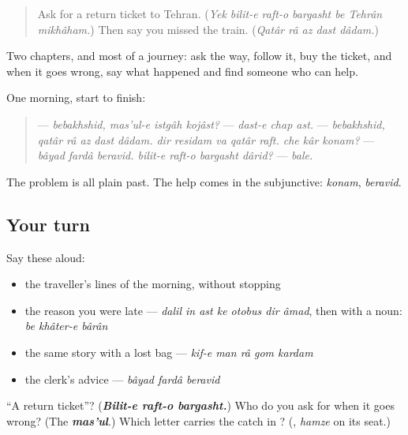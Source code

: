 \label{lesson:FA-R295-at-the-station}



\begin{quote}
Ask for a return ticket to Tehran. (\emph{Yek bilit-e raft-o bargasht be Tehrân mikhâham.}) Then say you missed the train. (\emph{Qatâr râ az dast dâdam.})
\end{quote}

\begin{grammarlens}[title={What you've built}]
Two chapters, and most of a journey: ask the way, follow it, buy the ticket, and when it goes wrong, say what happened and find someone who can help.

One morning, start to finish:

\begin{quote}
— \emph{bebakhshid, mas'ul-e istgâh kojâst?} — \emph{dast-e chap ast.} — \emph{bebakhshid, qatâr râ az dast dâdam. dir residam va qatâr raft. che kâr konam?} — \emph{bâyad fardâ beravid. bilit-e raft-o bargasht dârid?} — \emph{bale.}
\end{quote}

The problem is all plain past. The help comes in the subjunctive: \emph{konam}, \emph{beravid}.
\end{grammarlens}

\subsection*{Your turn}
Say these aloud:

\begin{itemize}
\raggedright
  \item the traveller's lines of the morning, without stopping
  \item the reason you were late — \emph{dalil in ast ke otobus dir âmad}, then with a noun: \emph{be khâter-e bârân}
  \item the same story with a lost bag — \emph{kif-e man râ gom kardam}
  \item the clerk's advice — \emph{bâyad fardâ beravid}
\end{itemize}

\begin{tcolorbox}[breakable,colback=teal!4,colframe=teal!35!black,title={Before you move on}]
\textquotedblleft{}A return ticket\textquotedblright{}? (\emph{\textbf{Bilit-e raft-o bargasht.}}) Who do you ask for when it goes wrong? (The \emph{\textbf{mas'ul}}.) Which letter carries the catch in \textbf{}? (\textbf{}, \emph{hamze} on its seat.)
\end{tcolorbox}
